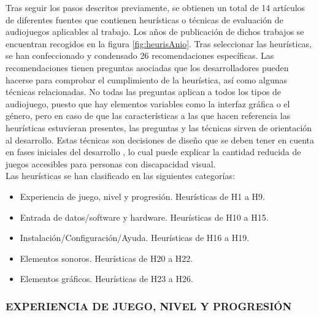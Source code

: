 Tras seguir los pasos descritos previamente, se obtienen un total de 14 artículos de diferentes fuentes que contienen heurísticas o técnicas de evaluación de audiojuegos aplicables al trabajo. Los años de publicación de dichos trabajos se encuentran recogidos en la figura \ref{fig:heurisAnio}. Tras seleccionar las heurísticas, se han confeccionado y condensado 26 recomendaciones específicas. Las recomendaciones tienen preguntas asociadas que los desarrolladores pueden hacerse para comprobar el cumplimiento de la heurística, así como algunas técnicas relacionadas. No todas las preguntas aplican a todos los tipos de audiojuego, puesto que hay elementos variables como la interfaz gráfica o el género, pero en caso de que las características a las que hacen referencia las heurísticas estuvieran presentes, las preguntas y las técnicas sirven de orientación al desarrollo. Estas técnicas son decisiones de diseño que se deben tener en cuenta en fases iniciales del desarrollo \citeauthor{AEVIFundacionONCE2023}, lo cual puede explicar la cantidad reducida de juegos accesibles para personas con discapacidad visual. \\

Las heurísticas se han clasificado en las siguientes categorías:
\begin{itemize}
	\item Experiencia de juego, nivel y progresión. Heurísticas de H1 a H9.
	\item Entrada de datos/software y hardware. Heurísticas de H10 a H15.
	\item Instalación/Configuración/Ayuda. Heurísticas de H16 a H19.
	\item Elementos sonoros. Heurísticas de H20 a H22.
	\item Elementos gráficos. Heurísticas de H23 a H26.
	
\end{itemize}
\subsubsection{EXPERIENCIA DE JUEGO, NIVEL Y PROGRESIÓN}

